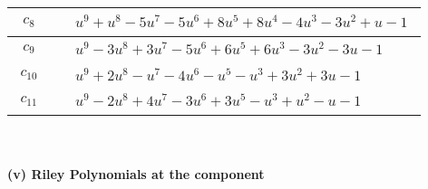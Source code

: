 \documentclass[1p]{elsarticle_modified}
\theoremstyle{definition}
\begin{document}
\begin{tabular}{m{50pt}|m{274pt}}
\hline $$\begin{aligned}c_{8}\end{aligned}$$&$\begin{aligned}
&u^9+u^8-5 u^7-5 u^6+8 u^5+8 u^4-4 u^3-3 u^2+u-1
\end{aligned}$\\
\hline $$\begin{aligned}c_{9}\end{aligned}$$&$\begin{aligned}
&u^9-3 u^8+3 u^7-5 u^6+6 u^5+6 u^3-3 u^2-3 u-1
\end{aligned}$\\
\hline $$\begin{aligned}c_{10}\end{aligned}$$&$\begin{aligned}
&u^9+2 u^8- u^7-4 u^6- u^5- u^3+3 u^2+3 u-1
\end{aligned}$\\
\hline $$\begin{aligned}c_{11}\end{aligned}$$&$\begin{aligned}
&u^9-2 u^8+4 u^7-3 u^6+3 u^5- u^3+u^2- u-1
\end{aligned}$\\
\hline
\end{tabular}\\~\\
\newpage\renewcommand{\arraystretch}{1}
\flushleft \textbf{(v) Riley Polynomials at the component}\newline \\
\end{document}
